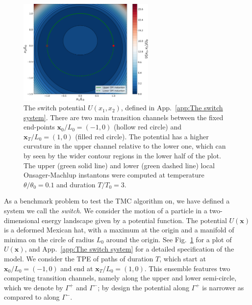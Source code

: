 \begin{figure}[t]
\includegraphics[width=0.6\textwidth]{figs_part1/mcmc/switch_potential}
\centering \caption{The switch potential $U(x_1, x_2)$, defined in App.~\ref{app:The switch system}. There are two main transition channels between the fixed end-points $\mathbf{x}_0/L_0 = (-1, 0)$ (hollow red circle) and $\mathbf{x}_T/L_0 = (1, 0)$ (filled red circle). The potential has a higher curvature in the upper channel relative to the lower one, which can by seen by the wider contour regions in the lower half of the plot. The upper (green solid line) and lower (green dashed line) local Onsager-Machlup instantons were computed at temperature $\theta/\theta_0 = 0.1$ and duration $T/T_0 = 3$.}
\label{fig:switch potential} 
\end{figure}

As a benchmark problem to test the TMC algorithm on, we have defined a system we call the \textit{switch}. We consider the motion of a particle in a two-dimensional energy landscape given by a potential function. The potential $U(\mathbf{x})$ is a deformed Mexican hat, with a maximum at the origin and a manifold of minima on the circle of radius $L_0$ around the origin. See Fig.~\ref{fig:switch potential} for a plot of $U(\mathbf{x})$, and App.~\ref{app:The switch system} for a detailed specification of the model. We consider the TPE of paths of duration $T$, which start at $\mathbf{x}_0/L_0 = (-1,0)$ and end at $\mathbf{x}_T/L_0 = (1,0)$. This ensemble features two competing transition channels, namely along the upper and lower semi-circle, which we denote by $\Gamma^{+}$ and $\Gamma^{-}$; by design the potential along $\Gamma^{+}$ is narrower as compared to along $\Gamma^{-}$.

